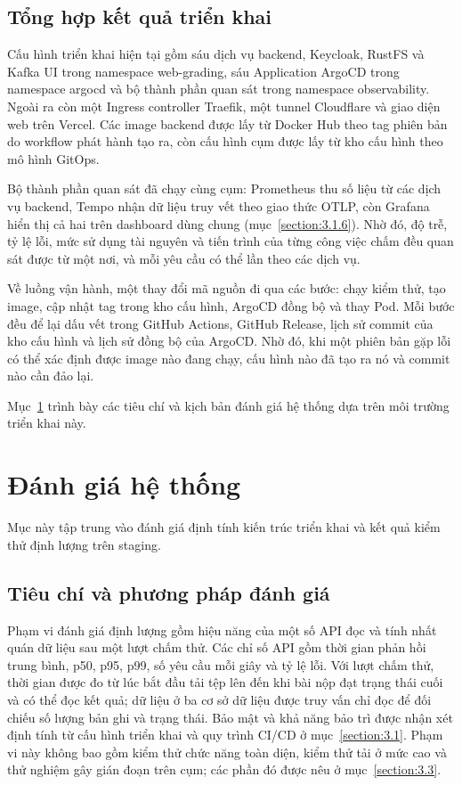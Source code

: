 \documentclass[../BTL.tex]{subfiles}
\begin{document}
\subsection{Tổng hợp kết quả triển khai}
\label{section:3.1.8}

Cấu hình triển khai hiện tại gồm sáu dịch vụ backend, Keycloak, RustFS và Kafka UI trong namespace web-grading, sáu Application ArgoCD trong namespace argocd và bộ thành phần quan sát trong namespace observability. Ngoài ra còn một Ingress controller Traefik, một tunnel Cloudflare và giao diện web trên Vercel. Các image backend được lấy từ Docker Hub theo tag phiên bản do workflow phát hành tạo ra, còn cấu hình cụm được lấy từ kho cấu hình theo mô hình GitOps.

Bộ thành phần quan sát đã chạy cùng cụm: Prometheus thu số liệu từ các dịch vụ backend, Tempo nhận dữ liệu truy vết theo giao thức OTLP, còn Grafana hiển thị cả hai trên dashboard dùng chung (mục~\ref{section:3.1.6}). Nhờ đó, độ trễ, tỷ lệ lỗi, mức sử dụng tài nguyên và tiến trình của từng công việc chấm đều quan sát được từ một nơi, và mỗi yêu cầu có thể lần theo các dịch vụ.

Về luồng vận hành, một thay đổi mã nguồn đi qua các bước: chạy kiểm thử, tạo image, cập nhật tag trong kho cấu hình, ArgoCD đồng bộ và thay Pod. Mỗi bước đều để lại dấu vết trong GitHub Actions, GitHub Release, lịch sử commit của kho cấu hình và lịch sử đồng bộ của ArgoCD. Nhờ đó, khi một phiên bản gặp lỗi có thể xác định được image nào đang chạy, cấu hình nào đã tạo ra nó và commit nào cần đảo lại.

Mục~\ref{section:3.2} trình bày các tiêu chí và kịch bản đánh giá hệ thống dựa trên môi trường triển khai này.

\section{Đánh giá hệ thống}
\label{section:3.2}

Mục này tập trung vào đánh giá định tính kiến trúc triển khai và kết quả kiểm thử định lượng trên staging.

\subsection{Tiêu chí và phương pháp đánh giá}
\label{section:3.2.1}

Phạm vi đánh giá định lượng gồm hiệu năng của một số API đọc và tính nhất quán dữ liệu sau một lượt chấm thử. Các chỉ số API gồm thời gian phản hồi trung bình, p50, p95, p99, số yêu cầu mỗi giây và tỷ lệ lỗi. Với lượt chấm thử, thời gian được đo từ lúc bắt đầu tải tệp lên đến khi bài nộp đạt trạng thái cuối và có thể đọc kết quả; dữ liệu ở ba cơ sở dữ liệu được truy vấn chỉ đọc để đối chiếu số lượng bản ghi và trạng thái. Bảo mật và khả năng bảo trì được nhận xét định tính từ cấu hình triển khai và quy trình CI/CD ở mục~\ref{section:3.1}. Phạm vi này không bao gồm kiểm thử chức năng toàn diện, kiểm thử tải ở mức cao và thử nghiệm gây gián đoạn trên cụm; các phần đó được nêu ở mục~\ref{section:3.3}.
\end{document}

